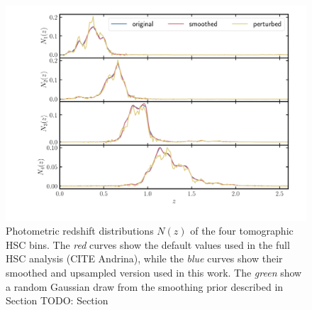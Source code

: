 \documentclass[a4paper,11pt]{article}
\begin{document}
\begin{figure}[ht]
\centering  
\includegraphics[width=1.2\textwidth]{./Nzs}
\caption{Photometric redshift
distributions $N(z)$
of the four tomographic HSC bins.
The \textit{red} curves show the
default values used in the 
full HSC analysis (CITE Andrina),
while the \textit{blue} curves 
show their smoothed and upsampled 
version used in this work. The
\textit{green} show a random 
Gaussian draw from the smoothing 
prior described in Section TODO: Section}
\label{fig:Nzs}
\end{figure}
\end{document}
